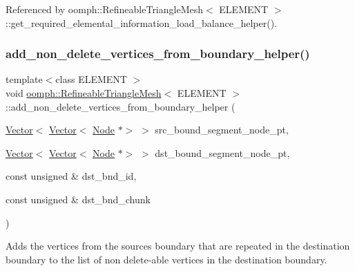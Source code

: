 Referenced by oomph\+::\+Refineable\+Triangle\+Mesh$<$ E\+L\+E\+M\+E\+N\+T $>$\+::get\+\_\+required\+\_\+elemental\+\_\+information\+\_\+load\+\_\+balance\+\_\+helper().

\mbox{\label{classoomph_1_1RefineableTriangleMesh_a2d290418f7617412aebc3d66bcace8b1}} 
\subsubsection{\texorpdfstring{add\+\_\+non\+\_\+delete\+\_\+vertices\+\_\+from\+\_\+boundary\+\_\+helper()}{add\_non\_delete\_vertices\_from\_boundary\_helper()}}
{\footnotesize\ttfamily template$<$class E\+L\+E\+M\+E\+NT $>$ \\
void \hyperlink{classoomph_1_1RefineableTriangleMesh}{oomph\+::\+Refineable\+Triangle\+Mesh}$<$ E\+L\+E\+M\+E\+NT $>$\+::add\+\_\+non\+\_\+delete\+\_\+vertices\+\_\+from\+\_\+boundary\+\_\+helper (\begin{DoxyParamCaption}\item[{\hyperlink{classoomph_1_1Vector}{Vector}$<$ \hyperlink{classoomph_1_1Vector}{Vector}$<$ \hyperlink{classoomph_1_1Node}{Node} $\ast$$>$ $>$}]{src\+\_\+bound\+\_\+segment\+\_\+node\+\_\+pt,  }\item[{\hyperlink{classoomph_1_1Vector}{Vector}$<$ \hyperlink{classoomph_1_1Vector}{Vector}$<$ \hyperlink{classoomph_1_1Node}{Node} $\ast$$>$ $>$}]{dst\+\_\+bound\+\_\+segment\+\_\+node\+\_\+pt,  }\item[{const unsigned \&}]{dst\+\_\+bnd\+\_\+id,  }\item[{const unsigned \&}]{dst\+\_\+bnd\+\_\+chunk }\end{DoxyParamCaption})\hspace{0.3cm}{\ttfamily [protected]}}



Adds the vertices from the sources boundary that are repeated in the destination boundary to the list of non delete-\/able vertices in the destination boundary. 



